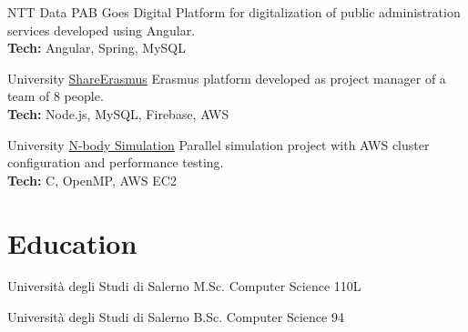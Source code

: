 \documentclass[
               singlesided,
               paper=a4,
               fontsize=10pt
              ]{my-resume}
\begin{document}
{
{NTT Data}
{PAB Goes Digital}
{
Platform for digitalization of public administration services developed using Angular.\\
\textbf{Tech:} Angular, Spring, MySQL
}


{University}
{\href{https://github.com/CiccioTecchio/SharErasmus}{ShareErasmus}}
{
Erasmus platform developed as project manager of a team of 8 people.\\
\textbf{Tech:} Node.js, MySQL, Firebase, AWS
}

{University}
{\href{https://github.com/CiccioTecchio/n-Body_MPI}{N-body Simulation}}
{
Parallel simulation project with AWS cluster configuration and performance testing.\\
\textbf{Tech:} C, OpenMP, AWS EC2
}

\section{Education}

{Università degli Studi di Salerno}
{M.Sc. Computer Science}
{110L}

{Università degli Studi di Salerno}
{B.Sc. Computer Science}
{94}

}

\makebody
\end{document}

